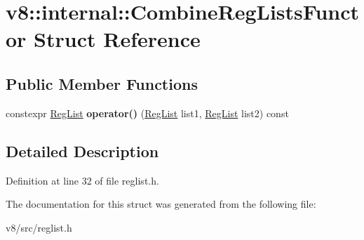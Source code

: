 \hypertarget{structv8_1_1internal_1_1CombineRegListsFunctor}{}\section{v8\+:\+:internal\+:\+:Combine\+Reg\+Lists\+Functor Struct Reference}
\label{structv8_1_1internal_1_1CombineRegListsFunctor}
\subsection*{Public Member Functions}
\begin{DoxyCompactItemize}
\item 
\mbox{\label{structv8_1_1internal_1_1CombineRegListsFunctor_a6f22bf2be455fdc93cb5ba4411443541}} 
constexpr \mbox{\hyperlink{classuint32__t}{Reg\+List}} {\bfseries operator()} (\mbox{\hyperlink{classuint32__t}{Reg\+List}} list1, \mbox{\hyperlink{classuint32__t}{Reg\+List}} list2) const
\end{DoxyCompactItemize}


\subsection{Detailed Description}


Definition at line 32 of file reglist.\+h.



The documentation for this struct was generated from the following file\+:\begin{DoxyCompactItemize}
\item 
v8/src/reglist.\+h\end{DoxyCompactItemize}

